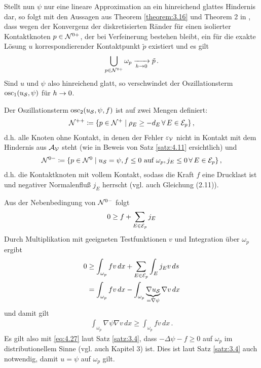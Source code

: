 Stellt nun $\psi$ nur eine lineare Approximation an ein hinreichend glattes Hindernis dar, so folgt mit den Aussagen aus Theorem  \ref{theorem:3.16} und Theorem 2 in \cite{Zhang}, dass wegen der Konvergenz der diskretisierten Ränder für einen isolierter Kontaktknoten $p \in \mathcal N^{0+}$, der bei
Verfeinerung bestehen bleibt, ein für die exakte Lösung $u$ korrespondierender Kontaktpunkt $\tilde p$ existiert und es gilt
\begin{align*}
	\bigcup_{p \in \mathcal N^{0+}} \omega_p \xrightarrow[h\rightarrow 0]{} \tilde p \, .
\end{align*}
Sind $u$ und $\psi$ also hinreichend glatt, so verschwindet der Oszillationsterm $\operatorname{osc}_1(u_{\mathcal S},\psi)$ für $h\rightarrow 0$.



Der Oszillationsterm $\operatorname{osc}_2(u_{\mathcal S}, \psi, f)$ ist auf zwei Mengen definiert:
\begin{align}\label{eq:4.25}
	\mathcal N^{++} \coloneqq \{p \in \mathcal N^{+}\mid \rho_E \ge - d_E \, \forall \, E \in \mathcal E_p\} \, ,
\end{align}
d.h. alle Knoten ohne Kontakt, in denen der Fehler $\varepsilon_{\mathcal V}$ nicht in Kontakt mit dem Hindernis aus $\mathcal A_{\mathcal V}$ steht (wie in Beweis von Satz \ref{satz:4.11} ersichtlich) und
\begin{align}\label{eq:4.26}
	\mathcal N^{0-}\coloneqq \{ p \in \mathcal N^0 \mid u_{\mathcal S} = \psi , f \le 0 \text{ auf } \omega_p, j_E \le 0 \, \forall \, E \in \mathcal E_p \} \, ,
\end{align}
d.h. die Kontaktknoten mit vollem Kontakt, sodass die Kraft $f$ eine Drucklast ist und negativer Normalenfluß $j_E$ herrscht (vgl. auch \cite{SiebVee} Gleichung (2.11)).


Aus der Nebenbedingung von $\mathcal N^{0-}$ folgt
\begin{align*}
	0 \ge f + \sum_{E \in \mathcal E_p} j_E
\end{align*}
Durch Multiplikation mit geeigneten Testfunktionen $v$ und Integration über $\omega_p$ ergibt
\begin{align*}
	0 &  \ge \int_{\omega_p} f v \, dx + \sum_{E\in \mathcal E_p} \int_E j_E v \, ds \\
	& = \int_{\omega_p} f v \, dx - \int_{\omega_p} \underbrace{\nabla u_{\mathcal S}}_{=\nabla \psi} \nabla v \, dx
\end{align*}
und damit gilt
\begin{align}\label{eq:4.27}
	 \int_{\omega_p} {\nabla \psi} \nabla v \, dx \ge \int_{\omega_p} f v \, dx \, .
\end{align}
Es gilt also mit \eqref{eq:4.27} laut Satz \ref{satz:3.4}, dass $-\Delta \psi - f \ge 0$ auf $\omega_p$ im distributionellem Sinne (vgl. auch \cite{Walker} Kapitel 3) ist. Dies ist laut Satz \ref{satz:3.4} auch notwendig, damit $u = \psi$ auf $\omega_p$ gilt.


